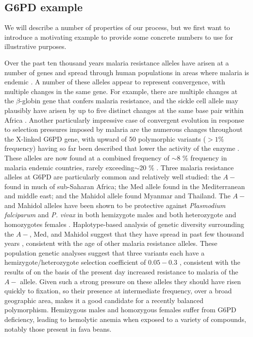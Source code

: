\documentclass{article}
\begin{document}
\subsection{G6PD example}
We will describe a number of properties of our process, but we first
want to introduce a motivating example to provide some concrete
numbers to use for illustrative purposes.

Over the past ten thousand years malaria resistance alleles have arisen at a number
of genes and spread through human populations in areas where malaria is endemic \citep{Kwiatkowski:05}. 
A number of these alleles appear to represent convergence, with
multiple changes in the same gene. 
For example, there are multiple
changes at the $\beta$-globin gene that confers malaria resistance,
and the sickle cell allele may plausibly have arisen by up to five distinct
changes at the same base pair within Africa
\citep{Flint:98,ralph2010parallel}.
Another particularly impressive case of convergent evolution in response to
selection pressures imposed by malaria are the numerous changes throughout the
X-linked G6PD gene, with upward of 50 polymorphic variants ($>1\%$ frequency) having so far been
described that lower the activity of the enzyme \citep{Howes-g6pd-variants,Minucci-g6pd}. These alleles are now
found at a combined frequency of $\sim$8 \% frequency in malaria endemic countries, rarely
exceeding$\sim$20 \% \citep{Howes-g6pd-preval}. Three malaria
resistance alleles at G6PD are particularly common and relatively well
studied: the $A-$ found in
much of sub-Saharan Africa; the Med allele found in the Mediterranean and middle
east; and the Mahidol allele found Myanmar and Thailand.
The $A-$ and Mahidol alleles have been shown
to be protective against {\it Plasmodium falciparum} and {\it P. vivax} in both
hemizygote males and both heterozygote and homozygotes females \citep{Ruwende-g6pd,
Louicharoen-g6pd}. Haplotype-based analysis of genetic diversity surrounding
the $A-$, Med, and Mahidol suggest that they have spread in past few
thousand years \citet{tishkoff-g6pd,Slatkin-age-est,Saunders-g6pd,Louicharoen-g6pd}, 
consistent with the age of other malaria resistance alleles. 
These population genetic analyses suggest that three variants each have a hemizygote/heterozygote 
selection coefficient of $0.05-0.3$ \citep{tishkoff-g6pd,Slatkin-age-est,Saunders-g6pd,Louicharoen-g6pd}, consistent with
the results of \citet{Ruwende-g6pd} on the basis of the present day increased resistance to malaria of the
$A-$ allele. 
Given such a strong pressure on these alleles they should have risen
quickly to fixation, so their presence at intermediate frequency,
over a broad geographic area, makes it a good candidate for a recently
balanced polymorphism. 
Hemizygous males and homozygous females suffer from G6PD deficiency,
leading to hemolytic anemia when exposed to a variety of compounds, notably
those present in fava beans. 
\end{document}
